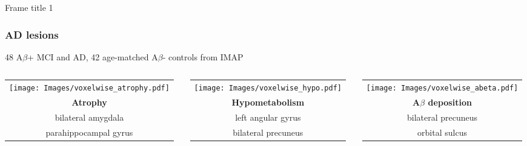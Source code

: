 \documentclass{beamer}
\newcommand{\myred}[1]{{\textbf{#1}}}
\begin{document}
\begin{frame}{Frame title 1}
\frametitle{AD lesions}
 48 A$\beta$+ MCI and AD, 42 age-matched A$\beta$- controls from IMAP 

  \begin{center} 
    \begin{columns}

      \begin{column}{0.33\textwidth}
        \begin{tabular}{c} 
	   \texttt{[image: Images/voxelwise\_atrophy.pdf]}\\
		\myred{Atrophy}\\ bilateral amygdala \\ {parahippocampal gyrus}
        \end{tabular}   
      \end{column}

      \begin{column}{0.33\textwidth}
        \begin{tabular}{c} 
	   \texttt{[image: Images/voxelwise\_hypo.pdf]}\\
		\myred{Hypometabolism} \\ left angular gyrus \\ bilateral precuneus 
		\end{tabular}   
      \end{column}

      \begin{column}{0.33\textwidth}
        \begin{tabular}{c} 
	   \texttt{[image: Images/voxelwise\_abeta.pdf]}\\
		\myred{A$\beta$ deposition}\\ bilateral precuneus \\ orbital sulcus 
		\end{tabular}   
      \end{column}

     \end{columns}
   \end{center}


 
 \end{frame}
\end{document}
